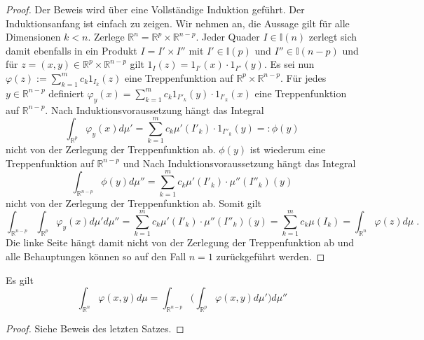 \begin{proof}
Der Beweis wird über eine Vollständige Induktion geführt. Der Induktionsanfang ist einfach zu zeigen. 
Wir nehmen an, die Aussage gilt für alle Dimensionen $k < n$.
Zerlege $\mathbb{R}^n = \mathbb{R}^p \times \mathbb{R}^{n-p}$. Jeder Quader $I \in \mathbb{I}(n)$ zerlegt sich damit ebenfalls in ein Produkt 
$I = I' \times I''$ mit $I'  \in \mathbb{I}(p)$ und  $I''  \in \mathbb{I}(n-p)$ und für $z = (x,y) \in  \mathbb{R}^p \times \mathbb{R}^{n-p}$ gilt $1_{I} (z) = 1_{I'}(x) \cdot 1_{I''}(y)$. Es sei nun $\varphi(z):=   \sum_{k=1}^m  c_k 1_{I_k}(z)$ eine Treppenfunktion auf $ \mathbb{R}^p \times \mathbb{R}^{n-p}$. Für jedes $y \in \mathbb{R}^{n-p}$ definiert  $\varphi_y(x)=   \sum_{k=1}^m  c_k 1_{I''_k}(y) \cdot 1_{I'_k}(x)$ eine Treppenfunktion auf $\mathbb{R}^{n-p}$. 
Nach Induktionsvoraussetzung hängt das Integral 
$$\int_{\mathbb{R}^p}  \varphi_y(x) d \mu' = \sum_{k=1}^m  c_k \mu'(I'_k)  \cdot 1_{I''_k}(y)  =: \phi(y)$$
nicht von der Zerlegung der Treppenfunktion ab. $\phi(y)$ ist wiederum eine Treppenfunktion auf $\mathbb{R}^{n-p}$ und Nach Induktionsvoraussetzung hängt das Integral 
$$\int_{\mathbb{R}^{n-p}}  \phi(y) d \mu'' = \sum_{k=1}^m  c_k \mu'(I'_k)  \cdot \mu'' (I''_k)(y) $$
nicht von der Zerlegung der Treppenfunktion ab. Somit gilt
$$\int_{\mathbb{R}^{n-p}} \int_{\mathbb{R}^p}  \varphi_y(x) d \mu'  d \mu''  =   \sum_{k=1}^m  c_k \mu'(I'_k)  \cdot \mu''(I''_k)(y) = \sum_{k=1}^m  c_k  \mu(I_k)  = \int_{\mathbb{R}^n} \varphi(z) d\mu\;.$$
Die linke Seite hängt  damit nicht von der Zerlegung der Treppenfunktion ab und alle Behauptungen können so auf den Fall $n=1$ zurückgeführt werden.
\end{proof}

\begin{Bemerkung}
Es gilt $$\int_{\mathbb{R}^n} \varphi(x,y) d \mu = \int_{\mathbb{R}^{n-p}} \biggl (\int_{\mathbb{R}^{p}}  \varphi(x,y) d \mu' \biggr ) d \mu''$$
\end{Bemerkung}
\begin{proof}
Siehe Beweis des letzten Satzes.
\end{proof}


